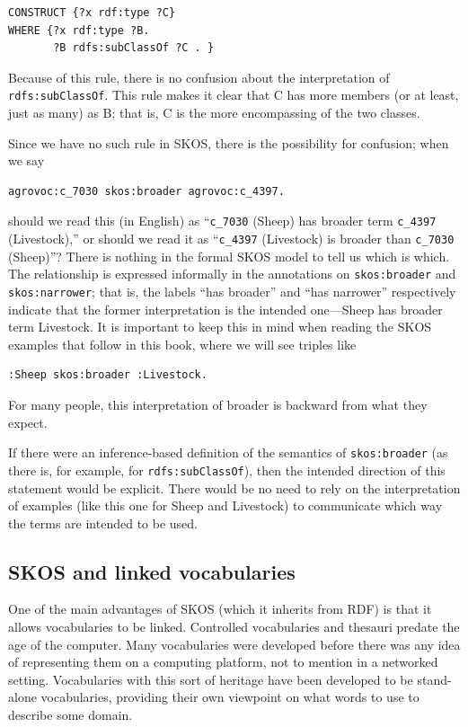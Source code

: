 \begin{lstlisting}
CONSTRUCT {?x rdf:type ?C}
WHERE {?x rdf:type ?B.
       ?B rdfs:subClassOf ?C . }
\end{lstlisting}

Because of this rule, there is no confusion about the interpretation of
\texttt{rdfs:subClassOf}. This rule makes it clear that C has more members (or at
least, just as many) as B; that is, C is the more encompassing of the
two classes.

Since we have no such rule in SKOS, there is the possibility for
confusion; when we say

\begin{lstlisting}
agrovoc:c_7030 skos:broader agrovoc:c_4397.
\end{lstlisting}

should we read this (in English) as ``\texttt{c\_7030} (Sheep) has broader term
\texttt{c\_4397} (Livestock),'' or should we read it as ``\texttt{c\_4397} (Livestock) is
broader than \texttt{c\_7030} (Sheep)''? There is nothing in the formal SKOS
model to tell us which is which. The relationship is expressed
informally in the annotations on \texttt{skos:broader} and \texttt{skos:narrower}; that
is, the labels ``has broader'' and ``has narrower'' respectively
indicate that the former interpretation is the intended one---Sheep has
broader term Livestock. It is important to keep this in mind when
reading the SKOS examples that follow in this book, where we will see
triples like

\begin{lstlisting}
:Sheep skos:broader :Livestock.
\end{lstlisting}

For many people, this interpretation of broader is backward from what
they expect.

If there were an inference-based definition of the semantics of
\texttt{skos:broader} (as there is, for example, for \texttt{rdfs:subClassOf}), then the
intended direction of this statement would be explicit.
There would be no need to rely on the interpretation of examples (like
this one for Sheep and
Livestock) to communicate which way the terms are intended to be used.

\subsection{SKOS and linked vocabularies}

One of the main advantages of SKOS (which it inherits from RDF) is that it allows vocabularies to be
linked. Controlled vocabularies and thesauri predate the age of the
computer. Many vocabularies were developed before there was any idea of
representing them on a computing platform, not to mention in a networked
setting. Vocabularies with this sort of heritage have been developed to
be stand-alone vocabularies, providing their own viewpoint on what words
to use to describe some domain.


